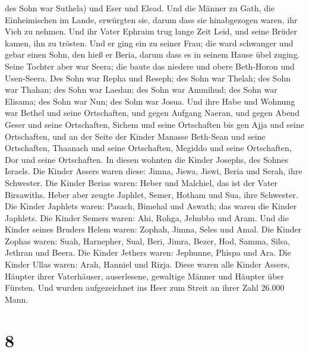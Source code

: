 des Sohn war Suthela) und Eser und Elead. Und die Männer zu Gath, die
Einheimischen im Lande, erwürgten sie, darum dass sie hinabgezogen
waren, ihr Vieh zu nehmen.  Und ihr Vater Ephraim trug
lange Zeit Leid, und seine Brüder kamen, ihn zu trösten. 
Und er ging ein zu seiner Frau; die ward schwanger und gebar einen Sohn,
den hieß er Beria, darum dass es in seinem Hause übel zuging.
 Seine Tochter aber war Seera; die baute das niedere und
obere Beth-Horon und Usen-Seera.  Des Sohn war Repha und
Reseph; des Sohn war Thelah; des Sohn war Thahan;  des
Sohn war Laedan; des Sohn war Ammihud; des Sohn war Elisama;
 des Sohn war Nun; des Sohn war Josua. 
Und ihre Habe und Wohnung war Bethel und seine Ortschaften, und gegen
Aufgang Naeran, und gegen Abend Geser und seine Ortschaften, Sichem und
seine Ortschaften bis gen Ajja und seine Ortschaften, 
und an der Seite der Kinder Manasse Beth-Sean und seine Ortschaften,
Thaanach und seine Ortschaften, Megiddo und seine Ortschaften, Dor und
seine Ortschaften. In diesen wohnten die Kinder Josephs, des Sohnes
Israels.  Die Kinder Assers waren diese: Jimna, Jiswa,
Jiswi, Beria und Serah, ihre Schwester.  Die Kinder
Berias waren: Heber und Malchiel, das ist der Vater Birsawiths.
 Heber aber zeugte Japhlet, Semer, Hotham und Sua, ihre
Schwester.  Die Kinder Japhlets waren: Pasach, Bimehal
und Aswath; das waren die Kinder Japhlets.  Die Kinder
Semers waren: Ahi, Rohga, Jehubba und Aram.  Und die
Kinder seines Bruders Helem waren: Zophah, Jimna, Seles und Amal.
 Die Kinder Zophas waren: Suah, Harnepher, Sual, Beri,
Jimra,  Bezer, Hod, Samma, Silsa, Jethran und Beera.
 Die Kinder Jethers waren: Jephunne, Phispa und Ara.
 Die Kinder Ullas waren: Arah, Hanniel und Rizja.
 Diese waren alle Kinder Assers, Häupter ihrer
Vaterhäuser, auserlesene, gewaltige Männer und Häupter über Fürsten. Und
wurden aufgezeichnet ins Heer zum Streit an ihrer Zahl 26.000 Mann.

\hypertarget{section-7}{%
\section{8}\label{section-7}}

